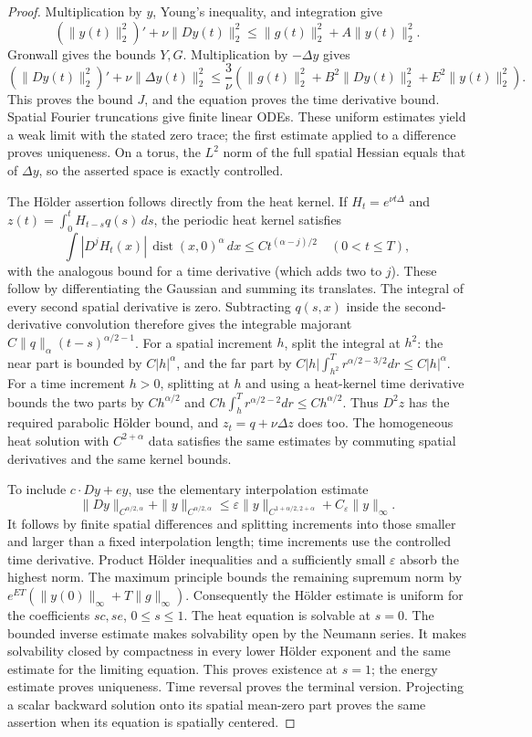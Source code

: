 \documentclass[11pt,a4paper]{article}
\begin{document}
\begin{proof}
Multiplication by $y$, Young's inequality, and integration give
\[
 (\|y(t)\|_2^2)' +\nu\|Dy(t)\|_2^2
 \leq \|g(t)\|_2^2+A\|y(t)\|_2^2.
\]
Gronwall gives the bounds $Y,G$. Multiplication by $-\Delta y$ gives
\[
 (\|Dy(t)\|_2^2)' +\nu\|\Delta y(t)\|_2^2
 \leq\frac3\nu(\|g(t)\|_2^2+B^2\|Dy(t)\|_2^2
                                  +E^2\|y(t)\|_2^2).
\]
This proves the bound $J$, and the equation proves the time derivative
bound. Spatial Fourier truncations give finite linear ODEs. These
uniform estimates yield a weak limit with the stated zero trace;
the first estimate applied to a difference proves uniqueness. On a
torus, the $L^2$ norm of the full spatial Hessian equals that of
$\Delta y$, so the asserted space is exactly controlled.

The H\"older assertion follows directly from the heat
kernel. If $H_t=e^{\nu t\Delta}$ and
$z(t)=\int_0^t H_{t-s}q(s)\,ds$, the periodic heat kernel satisfies
\[
 \int |D^j H_t(x)|\,\operatorname{dist}(x,0)^\alpha\,dx
       \leq C t^{(\alpha-j)/2}\quad(0<t\leq T),
\]
with the analogous bound for a time derivative (which adds two to $j$).
These follow by differentiating the Gaussian and summing its translates.
The integral of every second spatial derivative is zero. Subtracting
$q(s,x)$ inside the second-derivative convolution therefore gives the
integrable majorant $C\|q\|_\alpha(t-s)^{\alpha/2-1}$.
For a spatial increment $h$, split the integral at $h^2$: the near
part is bounded by $C|h|^\alpha$, and the far part by
$C|h|\int_{h^2}^T r^{\alpha/2-3/2}dr\leq C|h|^\alpha$.
For a time increment $h>0$, splitting at $h$ and using a heat-kernel
time derivative bounds the two parts by
$Ch^{\alpha/2}$ and
$Ch\int_h^T r^{\alpha/2-2}dr\leq Ch^{\alpha/2}$.
Thus $D^2z$ has the required parabolic H\"older bound, and
$z_t=q+\nu\Delta z$ does too. The homogeneous heat solution with
$C^{2+\alpha}$ data satisfies the same estimates by commuting spatial
derivatives and the same kernel bounds.

To include $c\cdot Dy+ey$, use the elementary interpolation estimate
\[
 \|Dy\|_{C^{\alpha/2,\alpha}}+
 \|y\|_{C^{\alpha/2,\alpha}}
 \leq\varepsilon\|y\|_{C^{1+\alpha/2,2+\alpha}}
                         +C_\varepsilon\|y\|_\infty.
\]
It follows by finite spatial differences and splitting increments into
those smaller and larger than a fixed interpolation length; time
increments use the controlled time derivative. Product H\"older
inequalities and a sufficiently small $\varepsilon$ absorb the highest
norm. The maximum principle bounds the remaining supremum norm by
$e^{ET}(\|y(0)\|_\infty+T\|g\|_\infty)$.
Consequently the H\"older estimate is uniform for the coefficients
$sc,se$, $0\leq s\leq1$. The heat equation is solvable at $s=0$.
The bounded inverse estimate makes solvability open by the Neumann
series. It makes solvability closed by compactness in every lower
H\"older exponent and the same estimate for the limiting equation.
This proves existence at $s=1$; the energy estimate proves uniqueness.
Time reversal proves the terminal version. Projecting a scalar
backward solution onto its spatial mean-zero part proves the same
assertion when its equation is spatially centered.
\end{proof}
\end{document}
